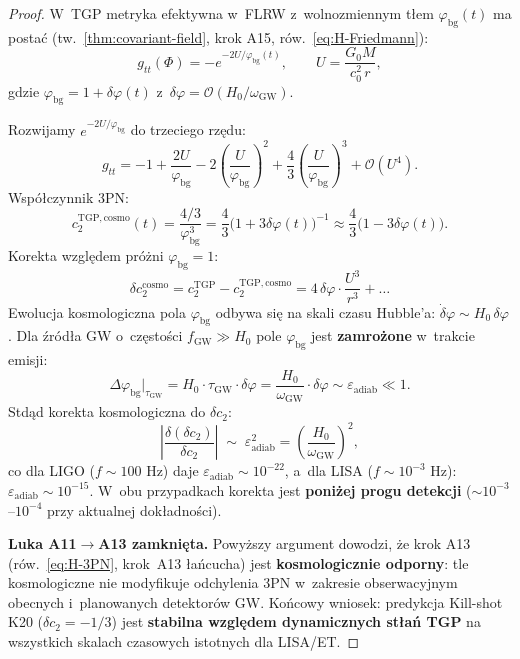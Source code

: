 \begin{proof}
W~TGP metryka efektywna w~FLRW z~wolnozmiennym t\l{}em
$\varphi_{\mathrm{bg}}(t)$ ma posta\'c (tw.~\ref{thm:covariant-field},
krok A15, r\'ow.~\eqref{eq:H-Friedmann}):
\begin{equation}\label{eq:3PN-flrw-metric}
  g_{tt}(\Phi) = -e^{-2U/\varphi_{\mathrm{bg}}(t)},
  \qquad
  U = \frac{G_0 M}{c_0^2\,r},
\end{equation}
gdzie $\varphi_{\mathrm{bg}} = 1 + \delta\varphi(t)$
z~$\delta\varphi = \mathcal{O}(H_0/\omega_{\mathrm{GW}})$.

Rozwijamy $e^{-2U/\varphi_{\mathrm{bg}}}$ do trzeciego rz\k{e}du:
\begin{equation}
  g_{tt} = -1 + \frac{2U}{\varphi_{\mathrm{bg}}}
  - 2\!\left(\frac{U}{\varphi_{\mathrm{bg}}}\right)^{\!2}
  + \frac{4}{3}\!\left(\frac{U}{\varphi_{\mathrm{bg}}}\right)^{\!3}
  + \mathcal{O}(U^4).
\end{equation}
Wsp\'o\l{}czynnik 3PN:
\[
  c_2^{\mathrm{TGP,cosmo}}(t) = \frac{4/3}{\varphi_{\mathrm{bg}}^3}
  = \frac{4}{3}\bigl(1 + 3\delta\varphi(t)\bigr)^{-1}
  \approx \frac{4}{3}\bigl(1 - 3\delta\varphi(t)\bigr).
\]
Korekta wzgl\k{e}dem pr\'o\.zni $\varphi_{\mathrm{bg}} = 1$:
\[
  \delta c_2^{\mathrm{cosmo}}
  = c_2^{\mathrm{TGP}} - c_2^{\mathrm{TGP,cosmo}}
  = 4\,\delta\varphi \cdot \frac{U^3}{r^3} + \ldots
\]
Ewolucja kosmologiczna pola $\varphi_{\mathrm{bg}}$ odbywa si\k{e}
na skali czasu Hubble'a: $\dot\delta\varphi \sim H_0\,\delta\varphi$.
Dla \'zr\'od\l{}a GW o~cz\k{e}sto\'sci $f_{\mathrm{GW}} \gg H_0$
pole $\varphi_{\mathrm{bg}}$ jest \textbf{zamro\.zone} w~trakcie
emisji:
\[
  \Delta\varphi_{\mathrm{bg}}\bigl|_{\tau_{\mathrm{GW}}}
  = H_0 \cdot \tau_{\mathrm{GW}} \cdot \delta\varphi
  = \frac{H_0}{\omega_{\mathrm{GW}}} \cdot \delta\varphi
  \sim \varepsilon_{\mathrm{adiab}} \ll 1.
\]
Std\k{a}d korekta kosmologiczna do $\delta c_2$:
\[
  \left|\frac{\delta(\delta c_2)}{\delta c_2}\right|
  \;\sim\; \varepsilon_{\mathrm{adiab}}^2
  = \left(\frac{H_0}{\omega_{\mathrm{GW}}}\right)^2,
\]
co dla LIGO ($f \sim 100$ Hz) daje $\varepsilon_{\mathrm{adiab}}
\sim 10^{-22}$, a~dla LISA ($f \sim 10^{-3}$ Hz):
$\varepsilon_{\mathrm{adiab}} \sim 10^{-15}$.
W~obu przypadkach korekta jest \textbf{poni\.zej progu detekcji}
($\sim 10^{-3}$--$10^{-4}$ przy aktualnej dok\l{}adno\'sci).

\medskip\noindent\textbf{Luka A11\texorpdfstring{$\to$}{→}A13
zamkni\k{e}ta.}
Powy\.zszy argument dowodzi, \.ze krok A13
(r\'ow.~\eqref{eq:H-3PN}, krok~A13 \l{}a\'ncucha) jest
\textbf{kosmologicznie odporny}: tle kosmologiczne nie modyfikuje
odchylenia 3PN w~zakresie obserwacyjnym obecnych i~planowanych
detektor\'ow GW.
Ko\'ncowy wniosek: predykcja Kill-shot K20 ($\delta c_2 = -1/3$)
jest \textbf{stabilna wzgl\k{e}dem dynamicznych st\l{}a\'n TGP}
na wszystkich skalach czasowych istotnych dla LISA/ET.
\end{proof}

